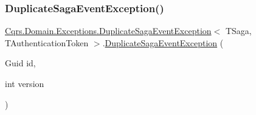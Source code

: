 \subsubsection{\texorpdfstring{Duplicate\+Saga\+Event\+Exception()}{DuplicateSagaEventException()}}
{\footnotesize\ttfamily \hyperlink{classCqrs_1_1Domain_1_1Exceptions_1_1DuplicateSagaEventException}{Cqrs.\+Domain.\+Exceptions.\+Duplicate\+Saga\+Event\+Exception}$<$ T\+Saga, T\+Authentication\+Token $>$.\hyperlink{classCqrs_1_1Domain_1_1Exceptions_1_1DuplicateSagaEventException}{Duplicate\+Saga\+Event\+Exception} (\begin{DoxyParamCaption}\item[{Guid}]{id,  }\item[{int}]{version }\end{DoxyParamCaption})}


